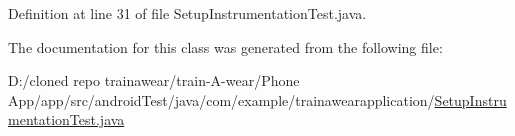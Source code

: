 Definition at line 31 of file Setup\+Instrumentation\+Test.\+java.



The documentation for this class was generated from the following file\+:\begin{DoxyCompactItemize}
\item 
D\+:/cloned repo trainawear/train-\/\+A-\/wear/\+Phone App/app/src/android\+Test/java/com/example/trainawearapplication/\mbox{\hyperlink{_setup_instrumentation_test_8java}{Setup\+Instrumentation\+Test.\+java}}\end{DoxyCompactItemize}
